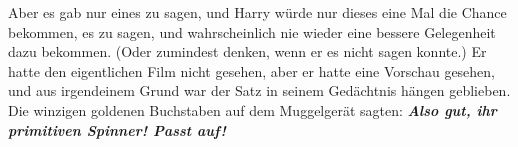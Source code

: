 Aber es gab nur eines zu sagen, und Harry würde nur dieses eine Mal die Chance
bekommen, es zu sagen, und wahrscheinlich nie wieder eine bessere Gelegenheit
dazu bekommen. (Oder zumindest denken, wenn er es nicht sagen konnte.) Er hatte
den eigentlichen Film nicht gesehen, aber er hatte eine Vorschau gesehen, und
aus irgendeinem Grund war der Satz in seinem Gedächtnis hängen geblieben. Die
winzigen goldenen Buchstaben auf dem Muggelgerät sagten: \textbf{\emph{ Also
gut, ihr primitiven Spinner! Passt auf!}}
